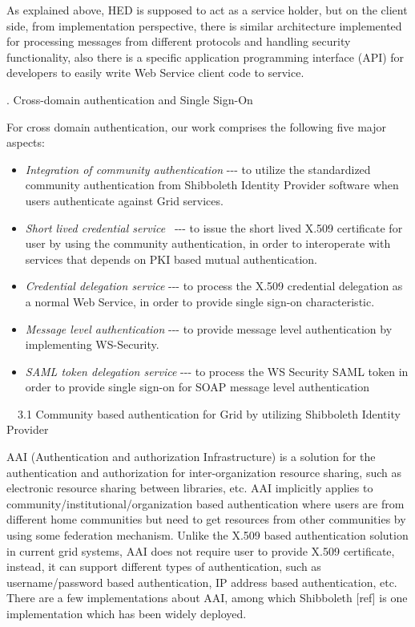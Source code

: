\documentclass{article}
\newcommand\liststyleLiii{%
\renewcommand\labelitemi{${\bullet}$}
\renewcommand\labelitemii{${\circ}$}
\renewcommand\labelitemiii{${\blacksquare}$}
\renewcommand\labelitemiv{${\bullet}$}
}
\begin{document}
As explained above, HED is supposed to act as a service holder, but on
the client side, from implementation perspective, there is similar
architecture implemented for processing messages from different
protocols and handling security functionality, also there is a specific
application programming interface (API) for developers to easily write
Web Service client code to service.


\bigskip

{. Cross-domain authentication and Single Sign-On
\par}

For cross domain authentication, our work comprises the following five
major aspects:

\liststyleLiii
\begin{itemize}
\item \textit{Integration of community authentication} -{}-{}- to
utilize the standardized community authentication from Shibboleth
Identity Provider software when users authenticate against Grid
services.
\item \textit{Short lived credential service} \ {}-{}-{}- to issue the
short lived X.509 certificate for user by using the community
authentication, in order to interoperate with services that depends on
PKI based mutual authentication.
\item \textit{Credential delegation service} -{}-{}- to process the
X.509 credential delegation as a normal Web Service, in order to
provide single sign-on characteristic.
\item \textit{Message level authentication} -{}-{}- to provide message
level authentication by implementing WS-Security.
\item \textit{SAML token delegation service} -{}-{}- to process the WS
Security SAML token in order to provide single sign-on for SOAP message
level authentication
\end{itemize}

\bigskip

\ \ 3.1 Community based authentication for Grid by utilizing Shibboleth
Identity Provider

AAI (Authentication and authorization Infrastructure) is a solution for
the authentication and authorization for inter-organization resource
sharing, such as electronic resource sharing between libraries, etc.
AAI implicitly applies to community/institutional/organization based
authentication where users are from different home communities but need
to get resources from other communities by using some federation
mechanism. Unlike the X.509 based authentication solution in current
grid systems, AAI does not require user to provide X.509 certificate,
instead, it can support different types of authentication, such as
username/password based authentication, IP address based
authentication, etc. There are a few implementations about AAI, among
which Shibboleth [ref] is one implementation which has been widely
deployed.
\end{document}
